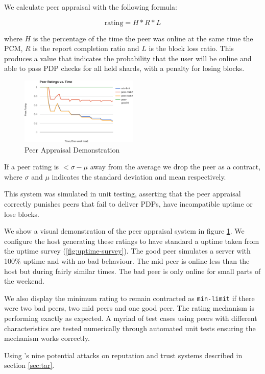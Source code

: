 \documentclass[11pt, a4paper, twocolumn, twoside]{report}
\def\code#1{\texttt{#1}}
\begin{document}
We calculate peer appraisal with the following formula:

$$\mbox{rating} = H * R * L$$

where $H$ is the percentage of the time the peer was online at the same time the PCM, $R$ is the report completion ratio and $L$ is the block loss ratio. This produces a value that indicates the probability that the user will be online and able to pass PDP checks for all held shards, with a penalty for losing blocks.

\begin{figure}[h]
 \centering
 \includegraphics[width=0.5\textwidth]{peer-appraisal}
 \caption{Peer Appraisal Demonstration}
 \label{fig:peer-appraisal}
\end{figure}

If a peer rating is $<\sigma - \mu$ away from the average we drop the peer as a contract, where $\sigma$ and $\mu$ indicates the standard deviation and mean respectively.

This system was simulated in unit testing, asserting that the peer appraisal correctly punishes peers that fail to deliver PDPs, have incompatible uptime or lose blocks.

We show a visual demonstration of the peer appraisal system in figure \ref{fig:peer-appraisal}. We configure the host generating these ratings to have standard a uptime taken from the uptime survey (\ref{fig:uptime-survey}). The good peer simulates a server with 100\% uptime and with no bad behaviour. The mid peer is online less than the host but during fairly similar times. The bad peer is only online for small parts of the weekend.

We also display the minimum rating to remain contracted as \code{min-limit} if there were two bad peers, two mid peers and one good peer. The rating mechanism is performing exactly as expected. A myriad of test cases using peers with different characteristics  are tested numerically through automated unit tests ensuring the mechanism works correctly.

Using \cite{josang2009challenges}'s nine potential attacks on reputation and trust systems described in section \ref{sec:tar}.
\end{document}

